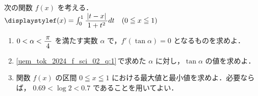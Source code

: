 ﻿\documentclass[../../../uem_tok_q.tex]{subfiles}
\begin{document}
    次の関数 $f(x)$ を考える．\\
    \hspace{3\zw}
    $\displaystyle%
        f(x)=\int_0^1\myfraca{|t-x|}{1+t^2}dt\quad(0\leqq x\leqq 1)%
    $

    \begin{enumerate}
        \item $0<\alpha<\myfraca{\pi}{4}$ を満たす実数 $\alpha$ で，$f'(\tan\alpha)=0$ となるものを求めよ．
            \label{uem_tok_2024_f_sci_02_q:1}
        \item \ref{uem_tok_2024_f_sci_02_q:1}\,で求めた $\alpha$ に対し，$\tan\alpha$ の値を求めよ．
        \item 関数 $f(x)$ の区間 $0\leqq x\leqq 1$ における最大値と最小値を求めよ．必要ならば，%
            $0.69<\log 2<0.7$ であることを用いてよい．
    \end{enumerate}
\end{document}
